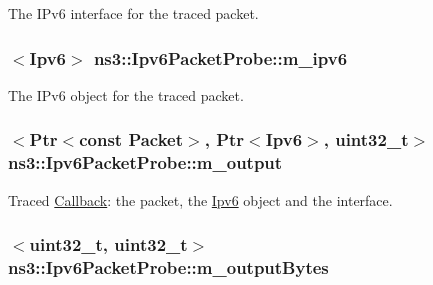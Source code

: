 The I\+Pv6 interface for the traced packet. 

\subsubsection[{\texorpdfstring{m\+\_\+ipv6}{m_ipv6}}]{$<${\bf Ipv6}$>$ ns3\+::\+Ipv6\+Packet\+Probe\+::m\+\_\+ipv6\hspace{0.3cm}{\ttfamily [private]}}\hypertarget{classns3_1_1Ipv6PacketProbe_a4ad3d2901e3f985bfdb2a124b86bec6d}{}\label{classns3_1_1Ipv6PacketProbe_a4ad3d2901e3f985bfdb2a124b86bec6d}


The I\+Pv6 object for the traced packet. 

\subsubsection[{\texorpdfstring{m\+\_\+output}{m_output}}]{$<${\bf Ptr}$<$const {\bf Packet}$>$, {\bf Ptr}$<${\bf Ipv6}$>$, uint32\+\_\+t$>$ ns3\+::\+Ipv6\+Packet\+Probe\+::m\+\_\+output\hspace{0.3cm}{\ttfamily [private]}}\hypertarget{classns3_1_1Ipv6PacketProbe_a690f7294eb5659e15cf1715c508cd387}{}\label{classns3_1_1Ipv6PacketProbe_a690f7294eb5659e15cf1715c508cd387}


Traced \hyperlink{classns3_1_1Callback}{Callback}\+: the packet, the \hyperlink{classns3_1_1Ipv6}{Ipv6} object and the interface. 

\subsubsection[{\texorpdfstring{m\+\_\+output\+Bytes}{m_outputBytes}}]{$<$uint32\+\_\+t, uint32\+\_\+t$>$ ns3\+::\+Ipv6\+Packet\+Probe\+::m\+\_\+output\+Bytes\hspace{0.3cm}{\ttfamily [private]}}\hypertarget{classns3_1_1Ipv6PacketProbe_aad6815016cab1ca0618b9a93534ed4ce}{}\label{classns3_1_1Ipv6PacketProbe_aad6815016cab1ca0618b9a93534ed4ce}


